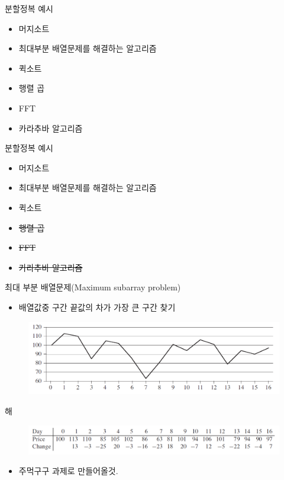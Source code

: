 \documentclass[10pt]{beamer}
\begin{document}
\begin{frame}{분할정복 예시}
    \begin{itemize}
        \item 머지소트
        \item 최대부분 배열문제를 해결하는 알고리즘
        \item 퀵소트
        \item 행렬 곱
        \item FFT
        \item 카라추바 알고리즘
    \end{itemize}
\end{frame}



\begin{frame}{분할정복 예시}
    \begin{itemize}
        \item 머지소트
        \item 최대부분 배열문제를 해결하는 알고리즘
        \item 퀵소트
        \item \sout{행렬 곱}
        \item \sout{FFT}
        \item \sout{카라추바 알고리즘}
    \end{itemize}
\end{frame}





\begin{frame}{최대 부분 배열문제(Maximum subarray problem)}
    \begin{itemize}
        \item 배열값중 구간 끝값의 차가 가장 큰 구간 찾기
    \end{itemize}
    \begin{figure}[h!]
        \includegraphics[scale=0.25]{subarray.png}
    \end{figure}
\end{frame}


\begin{frame}{해}
    \begin{figure}[h!]
        \includegraphics[scale=0.4]{table.png}
    \end{figure}

    \begin{itemize}
        \item 주먹구구
        과제로 만들어올것.
    \end{itemize}
\end{frame}
\end{document}
